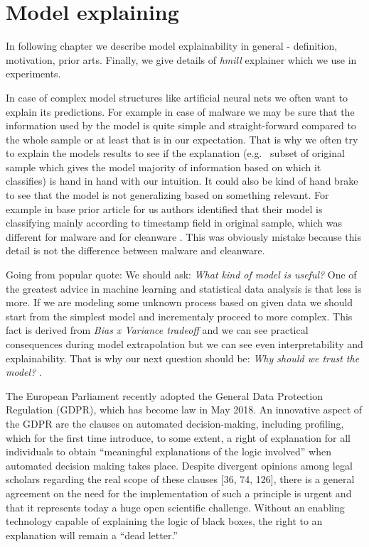 \chapter{Model explaining} \label{chap:expth}
In following chapter we describe model explainability in general - definition, motivation, prior arts. Finally, we give details of \emph{hmill} explainer which we use in experiments.




In case of complex model structures like artificial neural nets we often want to explain its predictions. For example in case of malware we may be sure that the information used by the model is quite simple and straight-forward compared to the whole sample or at least that is in our expectation. That is why we often try to explain the models results to see if the explanation (e.g. \ subset of original sample which gives the model majority of information based on which it classifies) is hand in hand with our intuition. It could also be kind of hand brake to see that the model is not generalizing based on something relevant. For example in base prior article for us authors identified that their model is classifying mainly according to timestamp field in original sample, which was different for malware and for cleanware \cite{Pevny2020}. This was obviously mistake because this detail is not the difference between malware and cleanware.

Going from popular quote:   We should ask: \emph{What kind of model is useful?}
One of the greatest advice in machine learning and statistical data analysis is that less is more. If we are modeling some unknown process based on given data we should start from the simplest model and incrementaly proceed to more complex. This fact is derived from \emph{Bias x Variance tradeoff}  and we can see practical consequences during model extrapolation but we can see even interpretability and explainability. That is why our next question should be: \emph{Why should we trust the model?} \cite{Ribeiro2016}.


The European Parliament recently adopted the General Data Protection Regulation (GDPR),
which has become law in May 2018. An innovative aspect of the GDPR are the clauses on automated decision-making, including profiling, which for the first time introduce, to some extent, a right of explanation for all individuals to obtain “meaningful explanations of the logic involved”
when automated decision making takes place. Despite divergent opinions among legal scholars
regarding the real scope of these clauses [36, 74, 126], there is a general agreement on the need for
the implementation of such a principle is urgent and that it represents today a huge open scientific
challenge. Without an enabling technology capable of explaining the logic of black boxes, the right
to an explanation will remain a “dead letter.” \cite{Guidotti2018}

